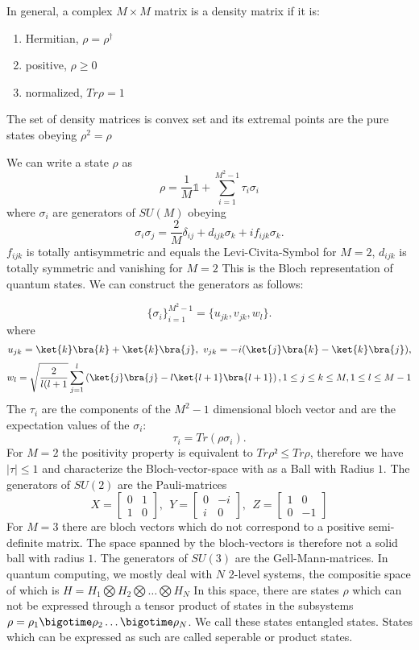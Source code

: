 In general, a complex $M \times M$ matrix is a density matrix if it is:
\begin{enumerate}[label=(\roman*)]
	\item Hermitian,	$\rho =\rho^{\dagger}$
	\item positive,		$\rho \ge 0$
	\item normalized,	$Tr\rho = 1$
\end{enumerate}
The set of density matrices is convex set and its extremal points are the pure states obeying $\rho^2 = \rho$

We can write a state $\rho$ as
$$\rho = \frac{1}{M} \mathbb{1} + \sum_{i=1}^{M^2-1} \tau_i \sigma_i$$
where $\sigma_i$ are generators of $SU(M)$ obeying
\[
	\sigma_i\sigma_j = \frac{2}{M}\delta_{ij} + d_{ijk}\sigma_k + if_{ijk}\sigma_k
.\]
$f_{ijk}$ is totally antisymmetric and equals the Levi-Civita-Symbol for $M=2$, $d_{ijk}$ is totally symmetric and vanishing for $M=2$
This is the Bloch representation of quantum states.
We can construct the generators as follows:

 \[
\{\sigma_i\}^{M^2-1}_{i=1} = \{u_{jk},v_{jk},w_l\}
.\]
where
$$
	u_{jk} = \ket{k}\bra{k}+\ket{k}\bra{j}, ~ v_{jk} = -i(\ket{j}\bra{k}-\ket{k}\bra{j}),
$$
$$
	w_l = \sqrt{\frac{2}{l(l+1}} \sum_{j=1}^{l} \left( \ket{j}\bra{j}-l\ket{l+1}\bra{l+1} \right),
	1\le j\le k\le M, 1\le l\le M-1
$$ \cite{kimura03}
The $\tau_i$ are the components of the $M^2-1$ dimensional bloch vector and are the expectation values of the $\sigma_i$:
 \[
	 \tau_i = Tr(\rho\sigma_i)
.\]
For $M=2$ the positivity property is equivalent to $Tr\rho²\le Tr\rho$, therefore we have $|\tau|\le 1$ and characterize the Bloch-vector-space with as a Ball with Radius $1$.
The generators of $SU(2)$ are the Pauli-matrices
  $$
 X = \begin{bmatrix} 0 & 1 \\
                    1 & 0
        \end{bmatrix},~

    ~Y = \begin{bmatrix} 0 & -i \\
                    i & 0
         \end{bmatrix},~

    ~Z = \begin{bmatrix} 1 & 0 \\
                    0 & -1
        \end{bmatrix}
$$
For $M=3$ there are bloch vectors which do not correspond to a positive semi-definite matrix.
The space spanned by the bloch-vectors is therefore not a solid ball with radius $1$.
The generators of  $SU(3)$ are the Gell-Mann-matrices.  
In quantum computing, we mostly deal with $N$ 2-level systems, the compositie space of which is $H = H_1 \bigotimes H_2 \bigotimes \ldots \bigotimes H_N$
In this space, there are states $\rho$ which can not be expressed through a tensor product of states in the subsystems $\rho = \rho_1\bigotime\rho_2\ldots\bigotime\rho_N$.
We call these states entangled states.
States which can be expressed as such are called seperable or product states.
